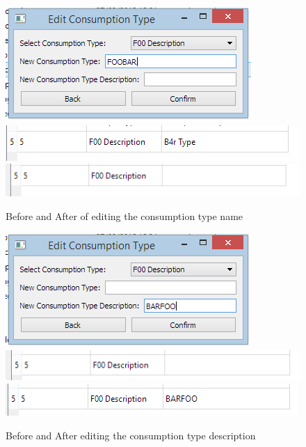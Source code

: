 \begin{figure}[H]
	\includegraphics{./testing/images/test_4_3_edit_type_name_data.png}
	\includegraphics{./testing/images/test_4_3_edit_type_name_before.png}
	\includegraphics{./testing/images/test_4_3_edit_type_name_after.png}
	\caption{Before and After of editing the consumption type name} \label{fig:test_4.3_result}
\end{figure}

\begin{figure}[H]
	\includegraphics{./testing/images/test_4_4_edit_type_description_data.png}
	\includegraphics{./testing/images/test_4_4_edit_type_description_before.png}
	\includegraphics{./testing/images/test_4_4_edit_type_description_after.png}
	\caption{Before and After editing the consumption type description} \label{fig:test_4.4_result}
\end{figure}

